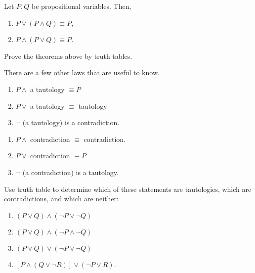 \documentclass[12pt]{amsart}
\begin{document}
\begin{theorem}
   Let $P, Q$ be propositional variables. Then,
    \begin{enumerate}
        \item $P \vee (P \wedge Q) \equiv P$,
        \item $P \wedge (P \vee Q) \equiv P$.
    \end{enumerate}
\end{theorem}


\begin{problem}
    Prove the theorems above by truth tables.
\end{problem}

There are a few other laws that are useful to know.
\begin{theorem}
    \begin{enumerate}
        \item $P \wedge$ a tautology $\equiv P$
        \item $P \vee$ a tautology $\equiv$ tautology
        \item $\neg$ (a tautology) is a contradiction.
    \end{enumerate}
\end{theorem}

\begin{theorem}
    \begin{enumerate}
        \item $P \wedge$ contradiction  $\equiv$ contradiction.
        \item $P \vee$ contradiction  $\equiv P$ 
        \item $\neg$ (a contradiction) is a tautology.
    \end{enumerate}
\end{theorem}
\begin{problem}
    Use truth table to determine which of these statements are tautologies,
which are contradictions, and which are neither:
\begin{enumerate}
    \item $(P \vee Q)\wedge (\neg P \vee \neg Q)$
    \item $(P \vee Q) \wedge (\neg P \wedge \neg Q)$
    \item $(P \vee Q) \vee (\neg P \vee \neg Q)$
    \item $[P \wedge (Q \vee \neg R)] \vee (\neg P \vee R)$.
\end{enumerate}
\end{problem}
\end{document}
